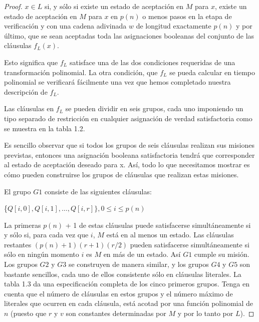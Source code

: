 \documentclass[a4paper, spanish, utf8]{memoir}
\begin{document}
\begin{proof}
$x \in L$ si, y sólo si existe un estado de aceptación en $M$ para $x$, existe un estado de aceptación en $M$ para $x$ en $p(n)$ o menos pasos en la etapa de verificación y con una cadena adivinada $w$ de longitud exactamente $p(n)$ y por último, que se sean aceptadas toda las asignaciones booleanas del conjunto de las cláusulas $f_L(x)$. 

Esto significa que $f_L$ satisface una de las dos condiciones requeridas de una transformación polinomial. La otra condición, que $f_L$ se pueda calcular en tiempo polinomial se verificará fácilmente una vez que hemos completado nuestra descripción de $f_L$.

Las cláusulas en $f_L$ se pueden dividir en seis grupos, cada uno imponiendo un tipo separado de restricción en cualquier asignación de verdad satisfactoria como se muestra en la tabla 1.2.

Es sencillo observar que si todos los grupos de seis cláusulas realizan sus misiones previstas, entonces una asignación booleana satisfactoria tendrá que corresponder al estado de aceptación deseado para x. Así, todo lo que necesitamos mostrar es cómo pueden construirse los grupos de cláusulas que realizan estas misiones.

El grupo $G1$ consiste de las siguientes cláusulas:

\begin{center} { \{$Q[i,0], Q[i,1], \dots, Q[i,r]\}, 0 \le i \le p(n)$ }
\end{center}


La primeras $p(n)$ + 1 de estas cláusulas puede satisfacerse simultáneamente si y sólo si, para cada vez que $i$, $M$ está en al menos un estado. Las cláusulas restantes $(p(n) + 1)(r + 1)(r / 2)$ pueden satisfacerse simultáneamente si sólo en ningún momento $i$ es $M$ en más de un estado. Así $G1$ cumple su misión. Los grupos $G2$ y $G3$ se construyen de manera similar, y los grupos $G4$ y $G5$ son bastante sencillos, cada uno de ellos consistente sólo en cláusulas literales. La tabla 1.3 da una especificación completa de los cinco primeros grupos. Tenga en cuenta que el número de cláusulas en estos grupos y el número máximo de literales que ocurren en cada cláusula, está acotad por una función polinomial de $n$ (puesto que $r$ y $v$ son constantes determinadas por $M$ y por lo tanto por $L$).



\end{proof}
\end{document}
